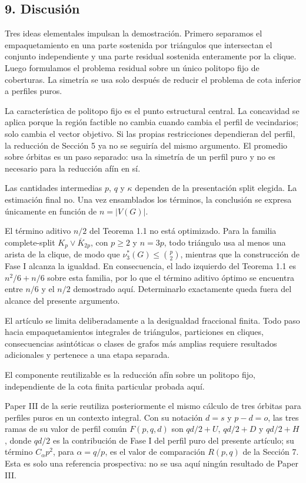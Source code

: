 \documentclass[spanish,11pt,a4paper]{article}
\begin{document}
\subsection{9. Discusión}\label{discusiuxf3n}

Tres ideas elementales impulsan la demostración. Primero separamos el
empaquetamiento en una parte sostenida por triángulos que intersectan el
conjunto independiente y una parte residual sostenida enteramente por la
clique. Luego formulamos el problema residual sobre un único politopo
fijo de coberturas. La simetría se usa solo después de reducir el
problema de cota inferior a perfiles puros.

La característica de politopo fijo es el punto estructural central. La
concavidad se aplica porque la región factible no cambia cuando cambia
el perfil de vecindarios; solo cambia el vector objetivo. Si las propias
restricciones dependieran del perfil, la reducción de Sección 5 ya no se
seguiría del mismo argumento. El promedio sobre órbitas es un paso
separado: usa la simetría de un perfil puro y no es necesario para la
reducción afín en sí.

Las cantidades intermedias \(p\), \(q\) y \(\kappa\) dependen de la
presentación split elegida. La estimación final no. Una vez ensamblados
los términos, la conclusión se expresa únicamente en función de
\(n=|V(G)|\).

El término aditivo \(n/2\) del Teorema 1.1 no está optimizado. Para la
familia complete-split \(K_p\vee\overline{K}_{2p}\), con \(p\ge2\) y
\(n=3p\), todo triángulo usa al menos una arista de la clique, de modo
que \(\nu_3^*(G)\le\binom p2\), mientras que la construcción de Fase I
alcanza la igualdad. En consecuencia, el lado izquierdo del Teorema 1.1
es \(n^2/6+n/6\) sobre esta familia, por lo que el término aditivo
óptimo se encuentra entre \(n/6\) y el \(n/2\) demostrado aquí.
Determinarlo exactamente queda fuera del alcance del presente argumento.

El artículo se limita deliberadamente a la desigualdad fraccional
finita. Todo paso hacia empaquetamientos integrales de triángulos,
particiones en cliques, consecuencias asintóticas o clases de grafos más
amplias requiere resultados adicionales y pertenece a una etapa
separada.

El componente reutilizable es la reducción afín sobre un politopo fijo,
independiente de la cota finita particular probada aquí.

Paper III de la serie reutiliza posteriormente el mismo cálculo de tres
órbitas para perfiles puros en un contexto integral. Con su notación
\(d=s\) y \(p-d=o\), las tres ramas de su valor de perfil común
\(F(p,q,d)\) son \(qd/2+U\), \(qd/2+D\) y \(qd/2+H\), donde \(qd/2\) es
la contribución de Fase I del perfil puro del presente artículo; su
término \(C_\alpha p^2\), para \(\alpha=q/p\), es el valor de
comparación \(R(p,q)\) de la Sección 7. Esta es solo una referencia
prospectiva: no se usa aquí ningún resultado de Paper III.
\end{document}
